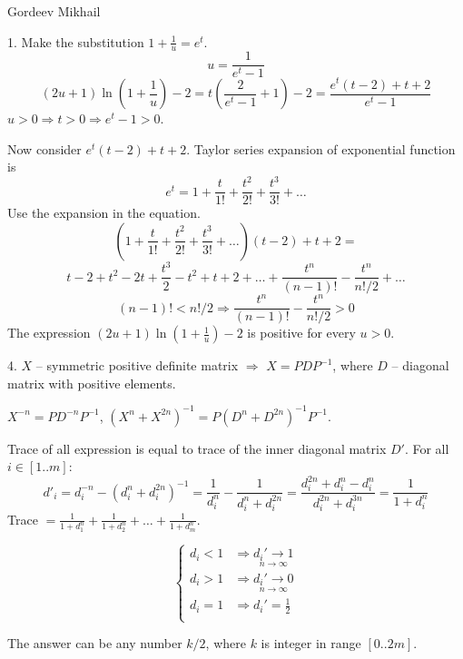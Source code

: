 \documentclass[a4paper, 14pt]{extarticle}
\begin{document}
\lstset{language=C++} 
\begin{flushright}
Gordeev Mikhail
\end{flushright}

\bigskip

1. Make the substitution $1 + \frac{1}{u} = e^t$.
$$u = \frac{1}{e^t - 1} $$
$$(2u + 1)\ln\left(1 + \frac{1}{u}\right) - 2 = t\left(\frac{2}{e^t - 1} + 1\right) - 2 = \frac{e^t(t-2) + t + 2}{e^t - 1} $$
$u > 0 \Rightarrow t > 0 \Rightarrow e^t - 1 > 0$.

Now consider $e^t(t-2) + t + 2$. Taylor series expansion of exponential function is
$$e^t = 1 + \frac{t}{1!} + \frac{t^2}{2!} + \frac{t^3}{3!} + \ldots$$
Use the expansion in the equation.
$$(1 + \frac{t}{1!} + \frac{t^2}{2!} + \frac{t^3}{3!} + \ldots)(t-2) + t + 2 = $$
$$t - 2 + t^2 - 2t + \frac{t^3}{2} - t^2 + t + 2 + \ldots + \frac{t^n}{(n-1)!} - \frac{t^n}{n!/2} + \ldots$$
$$(n-1)! < n! / 2 \Rightarrow \frac{t^n}{(n-1)!} - \frac{t^n}{n!/2} > 0$$
The expression $(2u + 1)\ln\left(1 + \frac{1}{u}\right) - 2$ is positive for every $u>0$.

\bigskip

4. $X$ -- symmetric positive definite matrix $\Rightarrow$ $X = PDP^{-1}$, where $D$ -- diagonal matrix with
positive elements.

$X^{-n} = PD^{-n}P^{-1}$,
$(X^{n} + X^{2n})^{-1} = P(D^{n} + D^{2n})^{-1}P^{-1}$.

Trace of all expression is equal to trace of the inner diagonal matrix $D'$.
For all $i \in [1..m]$:
$$d'_i = d_i^{-n} - (d_i^n + d_i^{2n})^{-1} =
\frac{1}{d_i^n} - \frac{1}{d_i^n + d_i^{2n}} =
\frac{d_i^{2n} + d_i^n - d_i^n}{d_i^{2n} + d_i^{3n}} = \frac{1}{1+d_i^n}$$
Trace $= \frac{1}{1+d_1^n} + \frac{1}{1+d_2^n} + \ldots + \frac{1}{1+d_m^n}$.

\begin{equation*}
\begin{cases}
d_i < 1 & \Rightarrow \underset{n \rightarrow \infty}{d_i' \rightarrow 1} \\
d_i > 1 & \Rightarrow \underset{n \rightarrow \infty}{d_i' \rightarrow 0} \\
d_i = 1 & \Rightarrow d_i' = \frac{1}{2}  \\
\end{cases}
\end{equation*}

The answer can be any number $k/2$, where $k$ is integer in range $[0 .. 2m]$.

\bigskip
\end{document}
